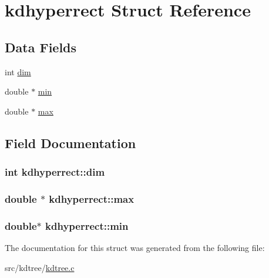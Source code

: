 \hypertarget{structkdhyperrect}{\section{kdhyperrect Struct Reference}
\label{structkdhyperrect}
}
\subsection*{Data Fields}
\begin{DoxyCompactItemize}
\item 
int \hyperlink{structkdhyperrect_a3db4daba51eb2a53cf9e94a6dbe8316a}{dim}
\item 
double $\ast$ \hyperlink{structkdhyperrect_a57d70c409c2bda502c3aa8fea80cc4f4}{min}
\item 
double $\ast$ \hyperlink{structkdhyperrect_aaeaab78eb4536bcd8d4ae4d5e08540f5}{max}
\end{DoxyCompactItemize}


\subsection{Field Documentation}
\hypertarget{structkdhyperrect_a3db4daba51eb2a53cf9e94a6dbe8316a}{
\subsubsection[{dim}]{\setlength{\rightskip}{0pt plus 5cm}int kdhyperrect\+::dim}}\label{structkdhyperrect_a3db4daba51eb2a53cf9e94a6dbe8316a}
\hypertarget{structkdhyperrect_aaeaab78eb4536bcd8d4ae4d5e08540f5}{
\subsubsection[{max}]{\setlength{\rightskip}{0pt plus 5cm}double $\ast$ kdhyperrect\+::max}}\label{structkdhyperrect_aaeaab78eb4536bcd8d4ae4d5e08540f5}
\hypertarget{structkdhyperrect_a57d70c409c2bda502c3aa8fea80cc4f4}{
\subsubsection[{min}]{\setlength{\rightskip}{0pt plus 5cm}double$\ast$ kdhyperrect\+::min}}\label{structkdhyperrect_a57d70c409c2bda502c3aa8fea80cc4f4}


The documentation for this struct was generated from the following file\+:\begin{DoxyCompactItemize}
\item 
src/kdtree/\hyperlink{kdtree_8c}{kdtree.\+c}\end{DoxyCompactItemize}
